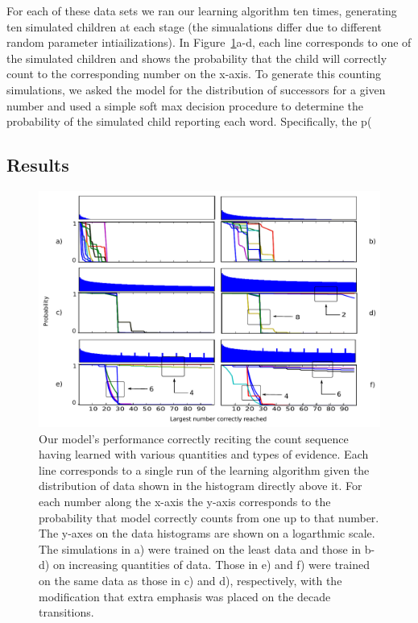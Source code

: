 \documentclass[10pt,letterpaper]{article}
\begin{document}
For each of these data sets we ran our learning algorithm ten times,
generating ten simulated children at each stage (the simualations
differ due to different random parameter intiailizations). In
Figure~\ref{fig:counting_grid}a-d, each line corresponds to one of the
simulated children and shows the probability that the child will
correctly count to the corresponding number on the x-axis. To generate
this counting simulations, we asked the model for the distribution of
successors for a given number and used a simple soft max decision procedure
to determine the probability of the simulated child reporting each
word. Specifically, the p(

 


\subsection{Results}


\begin{figure}[t]
\includegraphics[width=\linewidth]{figures/counting_grid2}
\caption{Our model's performance correctly reciting the count sequence
  having learned with various quantities and types of evidence. Each
  line corresponds to a single run of the learning algorithm given the
  distribution of data shown in the histogram directly above it. For
  each number along the x-axis the y-axis corresponds to the
  probability that model correctly counts from one up to that
  number. The y-axes on the data histograms are shown on a logarthmic
  scale. The simulations in a) were trained on the least data and
  those in b-d) on increasing quantities of data. Those in e) and f)
  were trained on the same data as those in c) and d), respectively,
  with the modification that extra emphasis was placed on the decade
  transitions. \label{fig:counting_grid}}
\end{figure}
\end{document}
